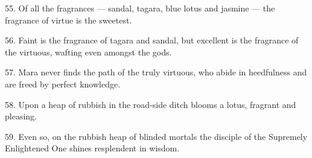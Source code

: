 55. Of all the fragrances — sandal, tagara, blue lotus and jasmine — the fragrance of virtue is the sweetest.

56. Faint is the fragrance of tagara and sandal, but excellent is the fragrance of the virtuous, wafting even amongst the gods.

57. Mara never finds the path of the truly virtuous, who abide in heedfulness and are freed by perfect knowledge.

58. Upon a heap of rubbish in the road-side ditch blooms a lotus, fragrant and pleasing.

59. Even so, on the rubbish heap of blinded mortals the disciple of the Supremely Enlightened One shines resplendent in wisdom.
